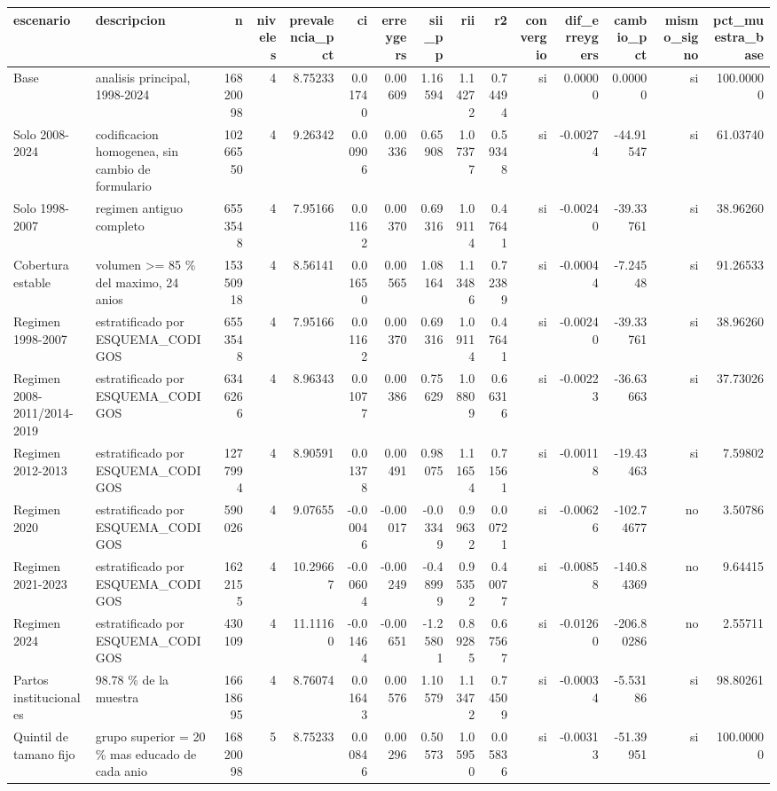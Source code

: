 \begin{tabular}{llrrrrrrrrrrrrr}
\toprule
escenario & descripcion & n & niveles & prevalencia\_pct & ci & erreygers & sii\_pp & rii & r2 & convergio & dif\_erreygers & cambio\_pct & mismo\_signo & pct\_muestra\_base \\
\midrule
Base & analisis principal, 1998-2024 & 16820098 & 4 & 8.75233 & 0.01740 & 0.00609 & 1.16594 & 1.14272 & 0.74494 & si & 0.00000 & 0.00000 & si & 100.00000 \\
Solo 2008-2024 & codificacion homogenea, sin cambio de formulario & 10266550 & 4 & 9.26342 & 0.00906 & 0.00336 & 0.65908 & 1.07377 & 0.59348 & si & -0.00274 & -44.91547 & si & 61.03740 \\
Solo 1998-2007 & regimen antiguo completo & 6553548 & 4 & 7.95166 & 0.01162 & 0.00370 & 0.69316 & 1.09114 & 0.47641 & si & -0.00240 & -39.33761 & si & 38.96260 \\
Cobertura estable & volumen >= 85 \% del maximo, 24 anios & 15350918 & 4 & 8.56141 & 0.01650 & 0.00565 & 1.08164 & 1.13486 & 0.72389 & si & -0.00044 & -7.24548 & si & 91.26533 \\
Regimen 1998-2007 & estratificado por ESQUEMA\_CODIGOS & 6553548 & 4 & 7.95166 & 0.01162 & 0.00370 & 0.69316 & 1.09114 & 0.47641 & si & -0.00240 & -39.33761 & si & 38.96260 \\
Regimen 2008-2011/2014-2019 & estratificado por ESQUEMA\_CODIGOS & 6346266 & 4 & 8.96343 & 0.01077 & 0.00386 & 0.75629 & 1.08809 & 0.66316 & si & -0.00223 & -36.63663 & si & 37.73026 \\
Regimen 2012-2013 & estratificado por ESQUEMA\_CODIGOS & 1277994 & 4 & 8.90591 & 0.01378 & 0.00491 & 0.98075 & 1.11654 & 0.71561 & si & -0.00118 & -19.43463 & si & 7.59802 \\
Regimen 2020 & estratificado por ESQUEMA\_CODIGOS & 590026 & 4 & 9.07655 & -0.00046 & -0.00017 & -0.03349 & 0.99632 & 0.00721 & si & -0.00626 & -102.74677 & no & 3.50786 \\
Regimen 2021-2023 & estratificado por ESQUEMA\_CODIGOS & 1622155 & 4 & 10.29667 & -0.00604 & -0.00249 & -0.48999 & 0.95352 & 0.40077 & si & -0.00858 & -140.84369 & no & 9.64415 \\
Regimen 2024 & estratificado por ESQUEMA\_CODIGOS & 430109 & 4 & 11.11160 & -0.01464 & -0.00651 & -1.25801 & 0.89285 & 0.67567 & si & -0.01260 & -206.80286 & no & 2.55711 \\
Partos institucionales & 98.78 \% de la muestra & 16618695 & 4 & 8.76074 & 0.01643 & 0.00576 & 1.10579 & 1.13472 & 0.74509 & si & -0.00034 & -5.53186 & si & 98.80261 \\
Quintil de tamano fijo & grupo superior = 20 \% mas educado de cada anio & 16820098 & 5 & 8.75233 & 0.00846 & 0.00296 & 0.50573 & 1.05950 & 0.05836 & si & -0.00313 & -51.39951 & si & 100.00000 \\
\bottomrule
\end{tabular}
